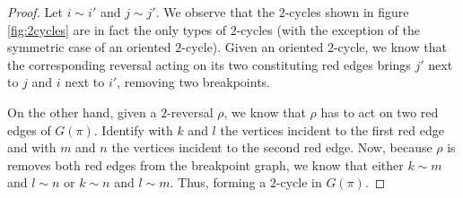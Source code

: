 \documentclass[11pt,DIV=11]{scrartcl}
\theoremstyle{definition}
\theoremstyle{remark}
\begin{document}
\begin{proof}
Let $i \sim i'$ and $j \sim j'$. We observe that the $2$-cycles shown in figure \ref{fig:2cycles} are in fact the only types of $2$-cycles (with the exception of the symmetric case of an oriented $2$-cycle). Given an oriented $2$-cycle, we know that the corresponding reversal acting on its two constituting red edges brings $j'$ next to $j$ and $i$ next to $i'$, removing two breakpoints.

On the other hand, given a $2$-reversal $\rho$, we know that $\rho$ has to act on two red edges of $G(\pi)$. Identify with $k$ and $l$ the vertices incident to the first red edge and with $m$ and $n$ the vertices incident to the second red edge. Now, because $\rho$ is removes both red edges from the breakpoint graph, we know that either $k \sim m$ and $l \sim n$ or $k \sim n$ and $l \sim m$. Thus, forming a $2$-cycle in $G(\pi)$.
\end{proof}
\end{document}
